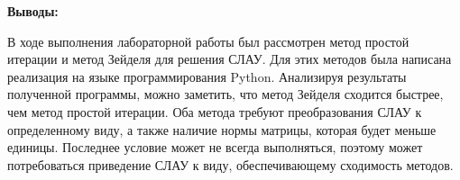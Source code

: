 \documentclass [12pt]{article}
\begin{document}
\textbf{Выводы:}

В ходе выполнения лабораторной работы был рассмотрен метод простой итерации и метод Зейделя для решения СЛАУ. Для этих методов была написана реализация на языке программирования Python. Анализируя результаты полученной программы, можно заметить, что метод Зейделя сходится быстрее, чем метод простой итерации. Оба метода требуют преобразования СЛАУ к определенному виду, а также наличие нормы матрицы, которая будет меньше единицы. Последнее условие может не всегда выполняться, поэтому может потребоваться приведение СЛАУ к виду, обеспечивающему сходимость методов. 
\end{document}
